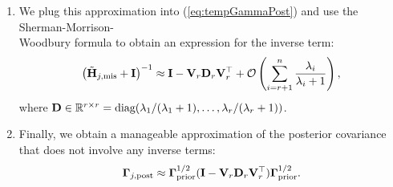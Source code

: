 \documentclass[11pt]{article}          %
\newcommand{\bbR}{\mathbb{R}}
\newcommand{\bfD}{{\bf D}}
\newcommand{\bfV}{{\bf V}}
\newcommand{\bfI}{{\bf I}}
\newcommand{\bfH}{{\bf H}}
\newcommand{\bfGamma}{\boldsymbol{\Gamma}}
\begin{document}
\begin{enumerate}
  \item We plug this approximation into (\ref{eq:tempGammaPost}) and use the Sherman-Morrison-\\Woodbury formula \cite{sherman1950adjustment} to obtain an expression for the inverse term:
    \begin{equation}
      \left(\tilde{\bfH}_{j, \rm mis} + \bfI\right)^{-1} \approx \bfI - \bfV_r \bfD_r \bfV_r^\top + \mathcal{O}\left(\sum_{i=r+1}^n \frac{\lambda_i}{\lambda_i+1}\right),
    \end{equation}
    where $\bfD \in \bbR^{r \times r} = \text{diag}(\lambda_1/(\lambda_1 + 1),\ldots,\lambda_r/(\lambda_r + 1))$.
  \item Finally, we obtain a manageable approximation of the posterior covariance that does not involve any inverse terms:
    \begin{equation}
      \boldsymbol{\Gamma}_{j, \rm post} \approx \bfGamma_{\rm prior}^{1/2} (\bfI - \bfV_r \bfD_r \bfV_r^\top)\bfGamma_{\rm prior}^{1/2}.
    \end{equation}
\end{enumerate}
\end{document}
